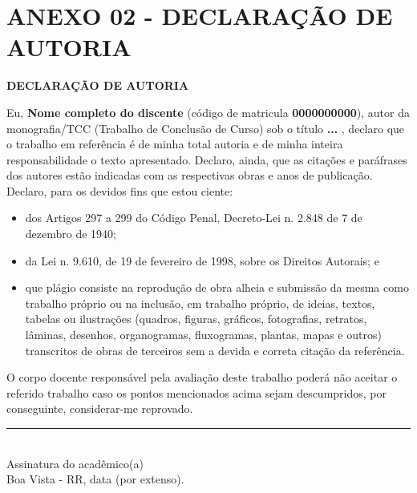 \section{ANEXO 02 - DECLARAÇÃO DE AUTORIA}

\begin{center}
    \fontsize{12}{15}\selectfont
    \vspace*{0.5cm}
    \textbf{DECLARAÇÃO DE AUTORIA}
    \vspace*{1cm}
\end{center}

\vspace*{\fill}

Eu, \textbf{Nome completo do discente} (código de matricula \textbf{0000000000}), autor da monografia/TCC (Trabalho de Conclusão de Curso) sob o título \textbf{ ... }, declaro que o trabalho em referência é de minha total autoria e de minha inteira responsabilidade o texto apresentado. Declaro, ainda, que as citações e paráfrases dos  autores estão indicadas com as respectivas obras e anos de publicação. Declaro, para os devidos fins que estou ciente:
\begin{itemize}\setlength\itemsep{.02em}
    \item  dos Artigos 297 a 299 do Código Penal, Decreto-Lei n. 2.848 de 7 de dezembro de 1940;
    \item  da Lei n. 9.610, de 19 de fevereiro de 1998, sobre os Direitos Autorais; e
    \item  que plágio consiste na reprodução de obra alheia e submissão da mesma como trabalho próprio ou na inclusão, em trabalho próprio, de ideias, textos, tabelas ou ilustrações (quadros, figuras, gráficos, fotografias, retratos, lâminas, desenhos, organogramas, fluxogramas, plantas, mapas e outros) transcritos de obras de terceiros sem a devida e correta citação da referência.
\end{itemize}

O corpo docente responsável pela avaliação deste trabalho poderá  não  aceitar o referido trabalho caso os pontos mencionados acima sejam descumpridos, por conseguinte, considerar-me reprovado.

\vspace*{\fill}

\begin{center}
    \rule{7cm}{0.4pt} \\
    \fontsize{12}{15}\selectfont Assinatura do acadêmico(a) \\ 
    Boa Vista - RR, data (por extenso).
\end{center}

\vfill